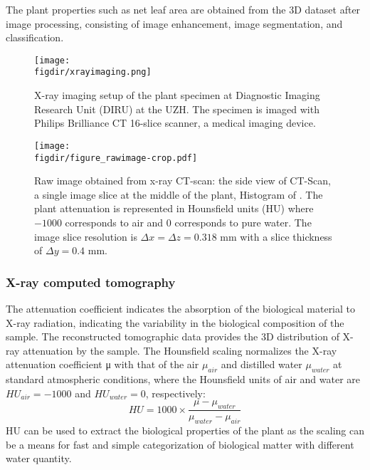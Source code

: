 The plant properties such as net leaf area are obtained from the 3D dataset after image processing, consisting of image enhancement, image segmentation, and classification.

\begin{figure}[t]
	\centering
	\texttt{[image: \\figdir/xrayimaging.png]}
	\caption{X-ray imaging setup of the plant specimen at Diagnostic Imaging Research Unit (DIRU) at the UZH. The specimen is imaged with Philips Brilliance CT 16-slice scanner, a medical imaging device.}
	\label{fig:xrayimaging}
\end{figure}

\begin{figure}[t]
	\centering
	\texttt{[image: \\figdir/figure\_rawimage-crop.pdf]}
	\caption{Raw image obtained from x-ray CT-scan:  the side view of CT-Scan,  a single image slice at the middle of the plant,  Histogram of . The plant attenuation is represented in Hounsfield units (HU) where $-1000$ corresponds to air and $0$ corresponds to pure water. The image slice resolution is $\Delta x = \Delta z=0.318$ mm with a slice thickness of $\Delta y=0.4$ mm.}
	\label{fig:figure_rawimage}
\end{figure}


\subsubsection*{X-ray computed tomography}

The attenuation coefficient indicates the absorption of the biological material to X-ray radiation, indicating the variability in the biological composition of the sample. The reconstructed tomographic data provides the 3D distribution of X-ray attenuation by the sample. The Hounsfield scaling normalizes the X-ray attenuation coefficient μ with that of the air $\mu_{\textit{air}}$ and distilled water $\mu_{\textit{water}}$ at standard atmospheric conditions, where the Hounsfield units of air and water are $HU_{\textit{air}}=-1000$ and $HU_{\textit{water}}=0$, respectively:
\begin{equation}
HU = 1000 \times \frac{{\mu  - {\mu _{\textit{water}}}}}{{{\mu _{\textit{water}}} - {\mu _{\textit{air}}}}}
\end{equation}
HU can be used to extract the biological properties of the plant as the scaling can be a means for fast and simple categorization of biological matter with different water quantity. 

